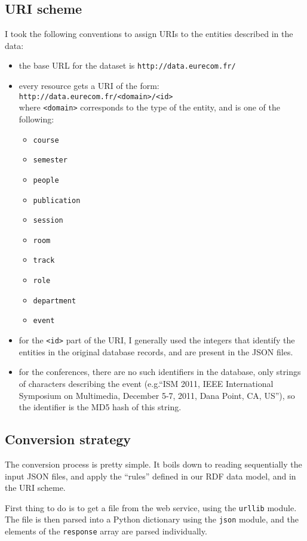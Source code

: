 \documentclass[a4paper,11pt]{report}
\begin{document}
\subsection{URI scheme}
I took the following conventions to assign URIs to the entities described in the data:
\begin{itemize}
\item the base URL for the dataset is \texttt{http://data.eurecom.fr/}
\item every resource gets a URI of the form: \\\texttt{http://data.eurecom.fr/<domain>/<id>}  \\where \texttt{<domain>} corresponds to the type of the entity, and is one of the following:
\begin{itemize}
\item \texttt{course}
\item \texttt{semester}
\item \texttt{people}
\item \texttt{publication}
\item \texttt{session}
\item \texttt{room}
\item \texttt{track}
\item \texttt{role}
\item \texttt{department}
\item \texttt{event}
\end{itemize}
\item for the  \texttt{<id>} part of the URI, I generally used the integers that identify the entities in the original database records, and are present in the JSON files. 
\item for the conferences, there are no such identifiers in the database, only strings of characters describing the event (e.g.``ISM 2011, IEEE International Symposium on Multimedia, December 5-7, 2011, Dana Point, CA, US''), so the identifier is the MD5 hash of this string.
\end{itemize}

\subsection{Conversion strategy}
The conversion process is pretty simple. It boils down to reading sequentially the input JSON files, and apply the ``rules'' defined in our RDF data model, and in the URI scheme. 

First thing to do is to get a file from the web service, using the \texttt{urllib} module. The file is then parsed into a Python dictionary using the \texttt{json} module, and the elements of the \texttt{response} array are parsed individually. 
\end{document}
